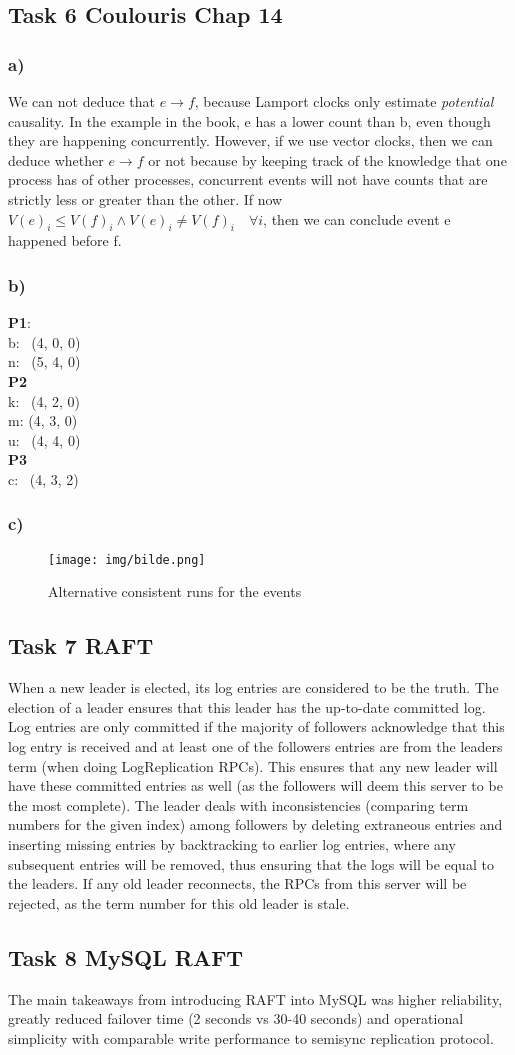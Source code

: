 \documentclass[12pt, titlepage]{report}
\begin{document}
\subsection*{Task 6 Coulouris Chap 14}
\subsubsection{a)}
We can not deduce that $e\rightarrow f$, because Lamport clocks only estimate \emph{potential} causality. In the example in the book, e has a lower count than b, even though they are happening concurrently. However, if we use vector clocks, then we can deduce whether $e\rightarrow f$ or not because by keeping track of the knowledge that one process has of other processes, concurrent events will not have counts that are strictly less or greater than the other. If now $V(e)_i \leq V(f)_i \land V(e)_i \neq V(f)_i \quad \forall i$, then we can conclude event e happened before f.
\subsubsection{b)}
\textbf{P1}: \\
b: \ (4, 0, 0) \\
n: \ (5, 4, 0) \\
\textbf{P2} \\
k: \ (4, 2, 0) \\
m: (4, 3, 0)\\
u: \ (4, 4, 0)\\
\textbf{P3} \\
c: \ (4, 3, 2)
\subsubsection{c)}
\begin{figure}[H]
    \centering
    \texttt{[image: img/bilde.png]}
    \caption{Alternative consistent runs for the events}
    \label{fig:my_label}
\end{figure}
\subsection*{Task 7 RAFT}
When a new leader is elected, its log entries are considered to be the truth. The election of a leader ensures that this leader has the up-to-date committed log. Log entries are only committed if the majority of followers acknowledge that this log entry is received and at least one of the followers entries are from the leaders term (when doing LogReplication RPCs). This ensures that any new leader will have these committed entries as well (as the followers will deem this server to be the most complete). The leader deals with inconsistencies (comparing term numbers for the given index) among followers by deleting extraneous entries and inserting missing entries by backtracking to earlier log entries, where any subsequent entries will be removed, thus ensuring that the logs will be equal to the leaders. If any old leader reconnects, the RPCs from this server will be rejected, as the term number for this old leader is stale.

\subsection*{Task 8 MySQL RAFT}
The main takeaways from introducing RAFT into MySQL was higher reliability, greatly reduced failover time (2 seconds vs 30-40 seconds) and operational simplicity with comparable write performance to semisync replication protocol.
\end{document}
